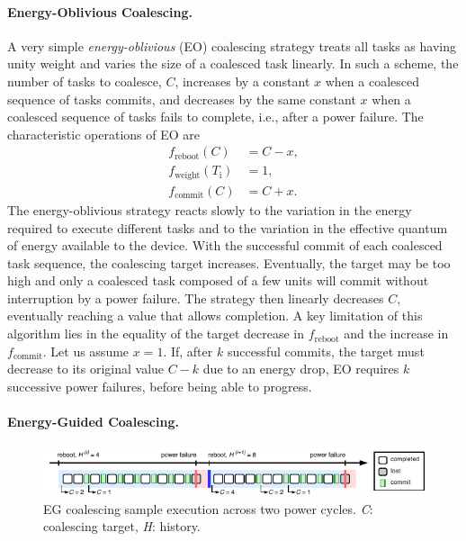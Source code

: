 \paragraph{Energy-Oblivious Coalescing.}
\label{subsec:energyBlind}
 
A very simple {\em energy-oblivious} (EO) coalescing strategy treats all tasks as having unity weight and varies the size of a coalesced task linearly. In such a scheme, the number of tasks to coalesce, $C$, increases by a constant $x$ when a coalesced sequence of tasks commits, and decreases by the same constant $x$ when a coalesced sequence of tasks fails to complete, i.e., after a power failure. The characteristic operations of EO are
%
\begin{equation}
	\begin{split}
		f_\text{reboot}(C) & = C - x, \\
		f_\text{weight}(T_\text{i}) & =  1, \\
		f_\text{commit}(C) & = C + x.
	\end{split}
	\label{eq:eo}
\end{equation}
%
The energy-oblivious strategy reacts slowly to the variation in the energy required to execute different tasks and to the variation in the effective quantum of energy available to the device. With the successful commit of each coalesced task sequence, the coalescing target increases. Eventually, the target may be too high and only a coalesced task composed of a few units will commit without interruption by a power failure. The strategy then linearly decreases $C$, eventually reaching a value that allows completion. A key limitation of this algorithm lies in the equality of the target decrease in $f_\text{reboot}$ and the increase in $f_\text{commit}$. Let us assume $x=1$. If, after $k$ successful commits, the target must decrease to its original value $C-k$ due to an energy drop, EO requires $k$ successive power failures, before being able to progress.

\paragraph{Energy-Guided Coalescing.}
\label{subsec:energyAware}

\begin{figure}
    \includegraphics[width=\linewidth]{figures/hg-coal-horiz.pdf}
    \caption{EG coalescing sample execution across two power cycles. \emph{C}: coalescing target, \emph{H}: history.}
    \label{fig:hg-coal}
\end{figure}

